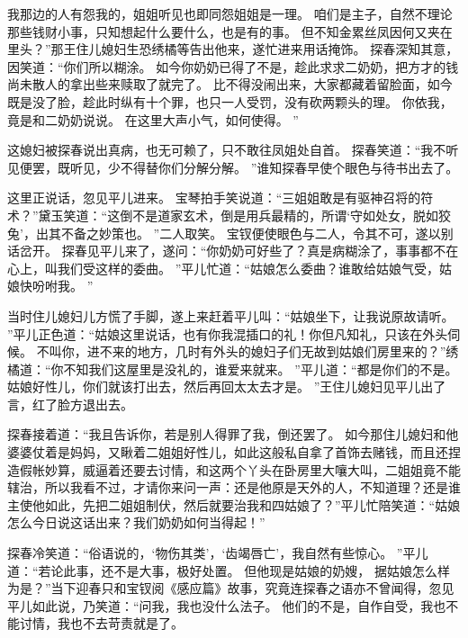 我那边的人有怨我的，姐姐听见也即同怨姐姐是一理。
咱们是主子，自然不理论那些钱财小事，只知想起什么要什么，也是有的事。
但不知金累丝凤因何又夹在里头？”那王住儿媳妇生恐绣橘等告出他来，遂忙进来用话掩饰。
探春深知其意，因笑道：“你们所以糊涂。
如今你奶奶已得了不是，趁此求求二奶奶，把方才的钱尚未散人的拿出些来赎取了就完了。
比不得没闹出来，大家都藏着留脸面，如今既是没了脸，趁此时纵有十个罪，也只一人受罚，没有砍两颗头的理。
你依我，竟是和二奶奶说说。
在这里大声小气，如何使得。
”\par
这媳妇被探春说出真病，也无可赖了，只不敢往凤姐处自首。
探春笑道：“我不听见便罢，既听见，少不得替你们分解分解。
”谁知探春早使个眼色与待书出去了。
\par
这里正说话，忽见平儿进来。
宝琴拍手笑说道：“三姐姐敢是有驱神召将的符术？”黛玉笑道：“这倒不是道家玄术，倒是用兵最精的，所谓‘守如处女，脱如狡兔’，出其不备之妙策也。
”二人取笑。
宝钗便使眼色与二人，令其不可，遂以别话岔开。
探春见平儿来了，遂问：“你奶奶可好些了？真是病糊涂了，事事都不在心上，叫我们受这样的委曲。
”平儿忙道：“姑娘怎么委曲？谁敢给姑娘气受，姑娘快吩咐我。
”\par
当时住儿媳妇儿方慌了手脚，遂上来赶着平儿叫：“姑娘坐下，让我说原故请听。
”平儿正色道：“姑娘这里说话，也有你我混插口的礼！你但凡知礼，只该在外头伺候。
不叫你，进不来的地方，几时有外头的媳妇子们无故到姑娘们房里来的？”绣橘道：“你不知我们这屋里是没礼的，谁爱来就来。
”平儿道：“都是你们的不是。
姑娘好性儿，你们就该打出去，然后再回太太去才是。
”王住儿媳妇见平儿出了言，红了脸方退出去。
\par
探春接着道：“我且告诉你，若是别人得罪了我，倒还罢了。
如今那住儿媳妇和他婆婆仗着是妈妈，又瞅着二姐姐好性儿，如此这般私自拿了首饰去赌钱，而且还捏造假帐妙算，威逼着还要去讨情，和这两个丫头在卧房里大嚷大叫，二姐姐竟不能辖治，所以我看不过，才请你来问一声：还是他原是天外的人，不知道理？还是谁主使他如此，先把二姐姐制伏，然后就要治我和四姑娘了？”平儿忙陪笑道：“姑娘怎么今日说这话出来？我们奶奶如何当得起！”\par
探春冷笑道：“俗语说的，‘物伤其类’，‘齿竭唇亡’，我自然有些惊心。
”平儿道：“若论此事，还不是大事，极好处置。
但他现是姑娘的奶嫂，
据姑娘怎么样为是？”当下迎春只和宝钗阅《感应篇》故事，究竟连探春之语亦不曾闻得，忽见平儿如此说，乃笑道：“问我，我也没什么法子。
他们的不是，自作自受，我也不能讨情，我也不去苛责就是了。
